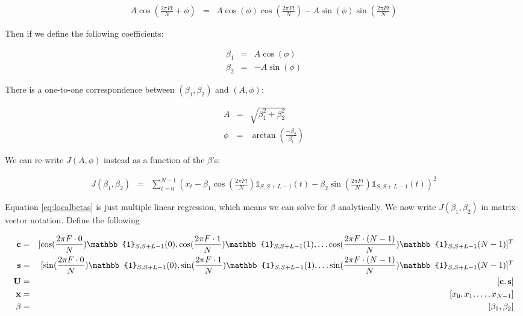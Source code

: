 \documentclass[11pt]{article}
\theoremstyle{plain}
\theoremstyle{definition}
\begin{document}
\begin{eqnarray}
	A \cos(\frac{2 \pi F t}{N} + \phi) &=& A\cos(\phi)\cos(\frac{2 \pi F t}{N})  - A \sin(\phi) \sin(\frac{2 \pi F t}{N})
\end{eqnarray}

\noindent Then if we define the following coefficients:

\begin{eqnarray}
	\beta_1 &=& A \cos(\phi) \nonumber \\
	\beta_2 &=& -A \sin(\phi)
\end{eqnarray}

\noindent There is a one-to-one correspondence between $(\beta_1, \beta_2)$ and $(A, \phi)$:

\begin{eqnarray}
\label{eq:aptobeta}
	A &=& \sqrt{\beta_1^2 + \beta_2^2} \nonumber \\
	\phi &=& \arctan(\frac{-\beta_2}{\beta_1})
\end{eqnarray}

\noindent We can re-write $J(A, \phi)$ instead as a function of the $\beta$'s:

\begin{eqnarray}
\label{eq:localbetas}
	J(\beta_1, \beta_2) &=& \sum_{t=0}^{N-1} (x_t - \beta_1 \cos(\frac{2 \pi F t}{N})  \mathbb{1}_{S, S+L-1}(t) - \beta_2 \sin(\frac{2 \pi F t}{N}) \mathbb{1}_{S, S+L-1}(t))^2
\end{eqnarray}

Equation \ref{eq:localbetas} is just multiple linear regression, which means we can solve for $\beta$ analytically. We now write $J(\beta_1, \beta_2)$ in matrix-vector notation. Define the following

\begin{eqnarray}
	{\bf c} &=& [\cos(\frac{2 \pi F \cdot 0}{N}) \mathbb{1}_{S,S+L-1}(0),  \cos(\frac{2 \pi F \cdot 1}{N}) \mathbb{1}_{S,S+L-1}(1), \ldots \cos(\frac{2 \pi F \cdot (N-1)}{N}) \mathbb{1}_{S,S+L-1}(N-1)]^T \nonumber \\
	{\bf s} &=& [\sin(\frac{2 \pi F \cdot 0}{N}) \mathbb{1}_{S,S+L-1}(0),  \sin(\frac{2 \pi F \cdot 1}{N}) \mathbb{1}_{S,S+L-1}(1), \ldots \sin(\frac{2 \pi F \cdot (N-1)}{N}) \mathbb{1}_{S,S+L-1}(N-1)]^T \nonumber \\
	{\bf U} &=& [{\bf c}, {\bf s}] \nonumber \\
	{\bf x} &=& [x_0, x_1, \ldots, x_{N-1}] \nonumber \\
	\beta &=& [\beta_1, \beta_2]
\end{eqnarray}
\end{document}
